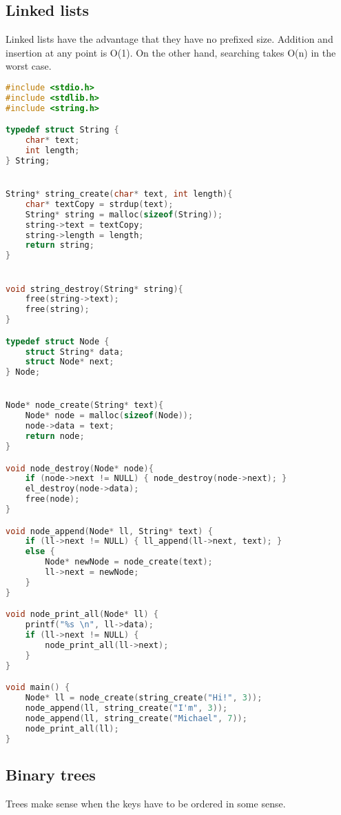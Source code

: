 \subsection{Linked lists}

Linked lists have the advantage that they have no prefixed size. Addition and insertion at any point is O(1). On the other hand, searching takes O(n) in the worst case.
\begin{lstlisting}[language=c]
#include <stdio.h>
#include <stdlib.h>
#include <string.h>

typedef struct String {
	char* text;
	int length;
} String;


String* string_create(char* text, int length){
	char* textCopy = strdup(text);
	String* string = malloc(sizeof(String));
	string->text = textCopy;
	string->length = length;
	return string;
}


void string_destroy(String* string){
	free(string->text);
	free(string);
}

typedef struct Node {
	struct String* data;
	struct Node* next;
} Node;


Node* node_create(String* text){
	Node* node = malloc(sizeof(Node));
	node->data = text;
	return node;
}

void node_destroy(Node* node){
	if (node->next != NULL) { node_destroy(node->next); }
	el_destroy(node->data);
	free(node);
}

void node_append(Node* ll, String* text) {
    if (ll->next != NULL) { ll_append(ll->next, text); }
    else {
        Node* newNode = node_create(text);
        ll->next = newNode;
    }
}

void node_print_all(Node* ll) {
    printf("%s \n", ll->data);
    if (ll->next != NULL) {
        node_print_all(ll->next);
    }
}

void main() {
    Node* ll = node_create(string_create("Hi!", 3));
    node_append(ll, string_create("I'm", 3));
    node_append(ll, string_create("Michael", 7));
    node_print_all(ll);
}
\end{lstlisting}


\subsection{Binary trees}

Trees make sense when the keys have to be ordered in some sense.

